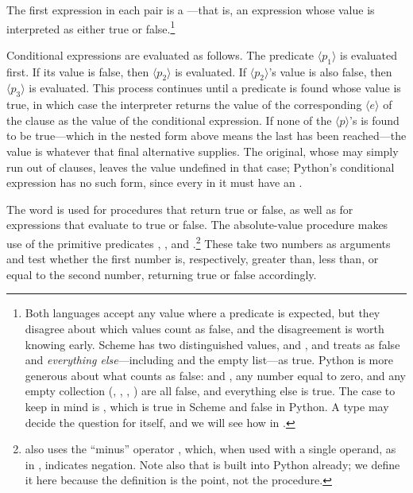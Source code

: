 The first expression in each pair is a ---that is, an
expression whose value is interpreted as either true or false.\footnote{Both
languages accept any value where a predicate is expected, but they disagree
about which values count as false, and the disagreement is worth knowing early.
Scheme has two distinguished values,  and , and treats
 as false and \textit{everything else}---including  and the
empty list---as true.  Python is more generous about what counts as false:
 and , any number equal to zero, and any empty
collection (, \code{[]}, \code{\{\}}, \code{()}) are all false, and
everything else is true.  The case to keep in mind is , which is true
in Scheme and false in Python.  A type may decide the question for itself, and
we will see how in .}

Conditional expressions are evaluated as follows.  The predicate \( \langle{p_1}\rangle \) is
evaluated first.  If its value is false, then \( \langle{p_2}\rangle \) is evaluated.  If
\( \langle{p_2}\rangle \)'s value is also false, then \( \langle{p_3}\rangle \) is evaluated.  This process
continues until a predicate is found whose value is true, in which case the
interpreter returns the value of the corresponding  \( \langle{e}\rangle \) of the clause as the value of the conditional expression.
If none of the \( \langle{p}\rangle \)'s is found to be true---which in the nested
form above means the last  has been reached---the value is whatever
that final alternative supplies.  The original, whose  may simply
run out of clauses, leaves the value undefined in that case; Python's
conditional expression has no such form, since every  in it must have
an .

The word  is used for procedures that return true or false,
as well as for expressions that evaluate to true or false.  The absolute-value
procedure  makes use of the primitive predicates \code{>}, \code{<},
and \code{==}.\footnote{ also uses the ``minus'' operator \code{-},
which, when used with a single operand, as in , indicates
negation.  Note also that  is built into Python already; we define it
here because the definition is the point, not the procedure.} These take two
numbers as arguments and test whether the first number is, respectively,
greater than, less than, or equal to the second number, returning true or false
accordingly.

